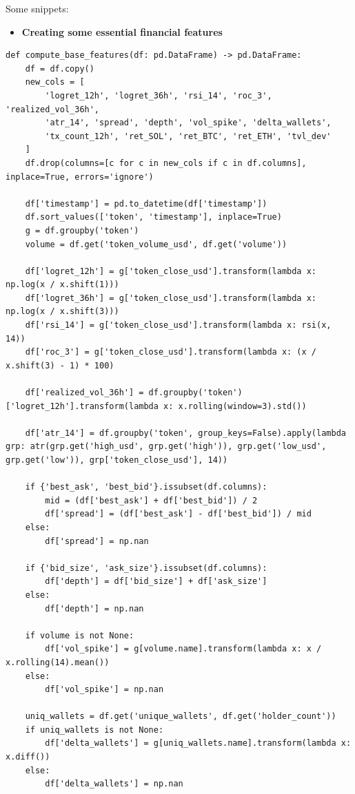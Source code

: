 \documentclass[
  a4paper,
  DIV=11,
  numbers=noendperiod]{scrreprt}
\providecommand{\tightlist}{%
  \setlength{\itemsep}{0pt}\setlength{\parskip}{0pt}}
\begin{document}
Some snippets:

\begin{itemize}
\tightlist
\item
  \textbf{Creating some essential financial features}
\end{itemize}

\begin{verbatim}
def compute_base_features(df: pd.DataFrame) -> pd.DataFrame:
    df = df.copy()
    new_cols = [
        'logret_12h', 'logret_36h', 'rsi_14', 'roc_3', 'realized_vol_36h',
        'atr_14', 'spread', 'depth', 'vol_spike', 'delta_wallets',
        'tx_count_12h', 'ret_SOL', 'ret_BTC', 'ret_ETH', 'tvl_dev'
    ]
    df.drop(columns=[c for c in new_cols if c in df.columns], inplace=True, errors='ignore')

    df['timestamp'] = pd.to_datetime(df['timestamp'])
    df.sort_values(['token', 'timestamp'], inplace=True)
    g = df.groupby('token')
    volume = df.get('token_volume_usd', df.get('volume'))

    df['logret_12h'] = g['token_close_usd'].transform(lambda x: np.log(x / x.shift(1)))
    df['logret_36h'] = g['token_close_usd'].transform(lambda x: np.log(x / x.shift(3)))
    df['rsi_14'] = g['token_close_usd'].transform(lambda x: rsi(x, 14))
    df['roc_3'] = g['token_close_usd'].transform(lambda x: (x / x.shift(3) - 1) * 100)
    
    df['realized_vol_36h'] = df.groupby('token')['logret_12h'].transform(lambda x: x.rolling(window=3).std())

    df['atr_14'] = df.groupby('token', group_keys=False).apply(lambda grp: atr(grp.get('high_usd', grp.get('high')), grp.get('low_usd', grp.get('low')), grp['token_close_usd'], 14))

    if {'best_ask', 'best_bid'}.issubset(df.columns):
        mid = (df['best_ask'] + df['best_bid']) / 2
        df['spread'] = (df['best_ask'] - df['best_bid']) / mid
    else:
        df['spread'] = np.nan

    if {'bid_size', 'ask_size'}.issubset(df.columns):
        df['depth'] = df['bid_size'] + df['ask_size']
    else:
        df['depth'] = np.nan

    if volume is not None:
        df['vol_spike'] = g[volume.name].transform(lambda x: x / x.rolling(14).mean())
    else:
        df['vol_spike'] = np.nan

    uniq_wallets = df.get('unique_wallets', df.get('holder_count'))
    if uniq_wallets is not None:
        df['delta_wallets'] = g[uniq_wallets.name].transform(lambda x: x.diff())
    else:
        df['delta_wallets'] = np.nan


\end{verbatim}
\end{document}
